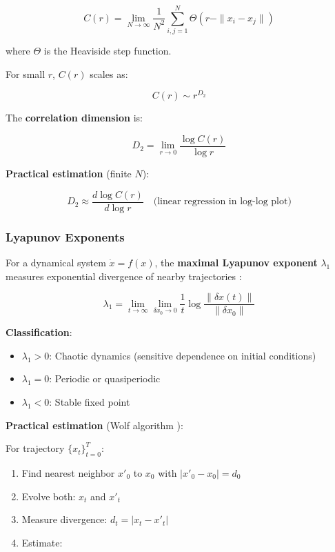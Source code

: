 \documentclass[11pt,a4paper]{article}
\begin{document}
\begin{equation}
C(r) = \lim_{N \to \infty} \frac{1}{N^2} \sum_{i,j=1}^N \Theta(r - \|x_i - x_j\|)
\end{equation}

where $\Theta$ is the Heaviside step function.

For small $r$, $C(r)$ scales as:

\begin{equation}
C(r) \sim r^{D_2}
\end{equation}

The \textbf{correlation dimension} is:

\begin{equation}
D_2 = \lim_{r \to 0} \frac{\log C(r)}{\log r}
\end{equation}

\textbf{Practical estimation} (finite $N$):

\begin{equation}
D_2 \approx \frac{d \log C(r)}{d \log r} \quad \text{(linear regression in log-log plot)}
\end{equation}

\subsubsection{Lyapunov Exponents}

For a dynamical system $\dot{x} = f(x)$, the \textbf{maximal Lyapunov exponent} $\lambda_1$ measures exponential divergence of nearby trajectories \cite{eckmann1985ergodic}:

\begin{equation}
\lambda_1 = \lim_{t \to \infty} \lim_{\delta x_0 \to 0} \frac{1}{t} \log \frac{\|\delta x(t)\|}{\|\delta x_0\|}
\end{equation}

\textbf{Classification}:
\begin{itemize}
\item $\lambda_1 > 0$: Chaotic dynamics (sensitive dependence on initial conditions)
\item $\lambda_1 = 0$: Periodic or quasiperiodic
\item $\lambda_1 < 0$: Stable fixed point
\end{itemize}

\textbf{Practical estimation} (Wolf algorithm \cite{wolf1985determining}):

For trajectory $\{x_t\}_{t=0}^T$:

\begin{enumerate}
\item Find nearest neighbor $x'_0$ to $x_0$ with $|x'_0 - x_0| = d_0$
\item Evolve both: $x_t$ and $x'_t$
\item Measure divergence: $d_t = |x_t - x'_t|$
\item Estimate:
\end{enumerate}
\end{document}

